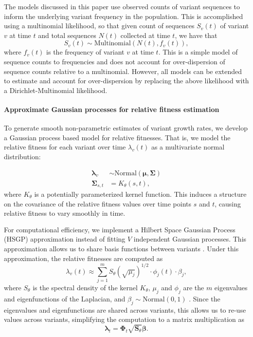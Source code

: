 \documentclass[11pt,oneside,letterpaper]{article}
\renewcommand{\vec}[1]{\boldsymbol{#1}}
\begin{document}
The models discussed in this paper use observed counts of variant sequences to inform the underlying variant frequency in the population.
This is accomplished using a multinomial likelihood, so that given count of sequences $S_{v}(t)$ of variant $v$ at time $t$ and total sequences $N(t)$ collected at time $t$, we have that
\begin{equation}
    S_{v}(t) \sim \text{Multinomial}(N(t), f_{v}(t)),
\end{equation}
where $f_{v}(t)$ is the frequency of variant $v$ at time $t$.
This is a simple model of sequence counts to frequencies and does not account for over-dispersion of sequence counts relative to a multinomial.
However, all models can be extended to estimate and account for over-dispersion by replacing the above likelihood with a Dirichlet-Multinomial likelihood.

\paragraph{Approximate Gaussian processes for relative fitness estimation}

To generate smooth non-parametric estimates of variant growth rates, we develop a Gaussian process based model for relative fitnesses.
That is, we model the relative fitness for each variant over time $\lambda_v(t)$ as a multivariate normal distribution:

\begin{align}
    \vec{\lambda}_{v} &\sim \text{Normal}(\vec{\mu}, \vec{\Sigma})\\
    \vec{\Sigma}_{s, t} &= K_{\theta}(s, t),
\end{align}
where $K_{\theta}$ is a potentially parameterized kernel function.
This induces a structure on the covariance of the relative fitness values over time points $s$ and $t$, causing relative fitness to vary smoothly in time.

For computational efficiency, we implement a Hilbert Space Gaussian Process (HSGP) approximation instead of fitting $V$ independent Gaussian processes.
This approximation allows us to share basis functions between variants \cite{riutortmayol2022practical}.
Under this approximation, the relative fitnesses are computed as
\begin{equation}
    \lambda_{v}(t) \approx \sum_{j=1}^{m} S_{\theta}(\sqrt{\mu_{j}})^{1/2} \cdot \phi_{j}(t) \cdot \beta_{j},
\end{equation}
where $S_{\theta}$ is the spectral density of the kernel $K_\theta$, $\mu_{j}$ and $\phi_{j}$ are the $m$ eigenvalues and eigenfunctions of the Laplacian, and $\beta_{j} \sim \text{Normal}(0,1)$ \cite{riutortmayol2022practical}.
Since the eigenvalues and eigenfunctions are shared across variants, this allows us to re-use values across variants, simplifying the computation to a matrix multiplication as
\begin{equation}
    \vec{\lambda}_{t} = \vec{\Phi}_{t} \sqrt{\vec{S}_{\theta}}\vec{\beta}.
\end{equation}
\end{document}
